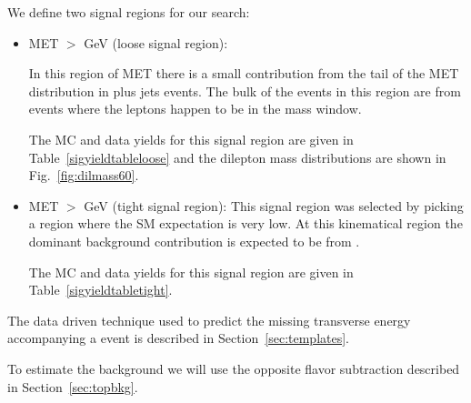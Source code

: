 We define two signal regions for our search:
\begin{itemize}
\item MET $>$ \signalmetl GeV (loose signal region):

In this region of MET there is a small contribution from the tail of the MET distribution 
in \Z plus jets events. 
The bulk of the events in this region are from \ttbar events where the leptons happen to be in the \Z 
mass window.


The MC and data yields for this signal region are given in Table~\ref{sigyieldtableloose} and the dilepton
mass distributions are shown in Fig.~\ref{fig:dilmass60}.



\item MET $>$ \signalmett GeV (tight signal region):
This signal region was selected by picking a region where the SM 
expectation is very low.
At this kinematical region the dominant background contribution is expected to be from \ttbar.

The MC and data yields for this signal region are given in Table~\ref{sigyieldtabletight}.
\end{itemize}

\noindent The data driven technique used to predict the missing transverse energy accompanying 
a \Z event is described in Section~\ref{sec:templates}.

\noindent To estimate the \ttbar background we will use the opposite flavor subtraction
 described in Section~\ref{sec:topbkg}.



